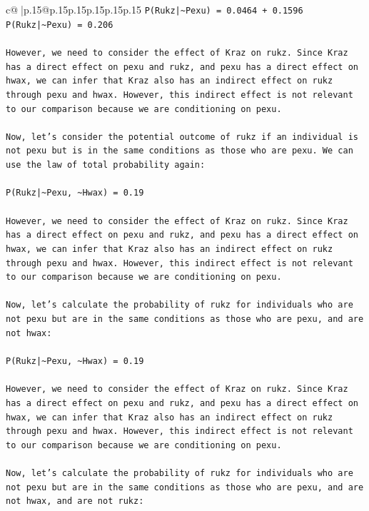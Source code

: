 \documentclass{article}
\begin{document}
{\begin{supertabular}{c@{$\;$}|p{.15\linewidth}@{}p{.15\linewidth}p{.15\linewidth}p{.15\linewidth}p{.15\linewidth}p{.15\linewidth}}
{{{\texttt{P(Rukz|\textasciitilde{}Pexu) = 0.0464 + 0.1596} \\
\texttt{P(Rukz|\textasciitilde{}Pexu) = 0.206} \\
\\ 
\texttt{However, we need to consider the effect of Kraz on rukz. Since Kraz has a direct effect on pexu and rukz, and pexu has a direct effect on hwax, we can infer that Kraz also has an indirect effect on rukz through pexu and hwax. However, this indirect effect is not relevant to our comparison because we are conditioning on pexu.} \\
\\ 
\texttt{Now, let's consider the potential outcome of rukz if an individual is not pexu but is in the same conditions as those who are pexu. We can use the law of total probability again:} \\
\\ 
\texttt{P(Rukz|\textasciitilde{}Pexu, \textasciitilde{}Hwax) = 0.19} \\
\\ 
\texttt{However, we need to consider the effect of Kraz on rukz. Since Kraz has a direct effect on pexu and rukz, and pexu has a direct effect on hwax, we can infer that Kraz also has an indirect effect on rukz through pexu and hwax. However, this indirect effect is not relevant to our comparison because we are conditioning on pexu.} \\
\\ 
\texttt{Now, let's calculate the probability of rukz for individuals who are not pexu but are in the same conditions as those who are pexu, and are not hwax:} \\
\\ 
\texttt{P(Rukz|\textasciitilde{}Pexu, \textasciitilde{}Hwax) = 0.19} \\
\\ 
\texttt{However, we need to consider the effect of Kraz on rukz. Since Kraz has a direct effect on pexu and rukz, and pexu has a direct effect on hwax, we can infer that Kraz also has an indirect effect on rukz through pexu and hwax. However, this indirect effect is not relevant to our comparison because we are conditioning on pexu.} \\
\\ 
\texttt{Now, let's calculate the probability of rukz for individuals who are not pexu but are in the same conditions as those who are pexu, and are not hwax, and are not rukz:} \\
\\ 
}}}
\end{supertabular}}
\end{document}
